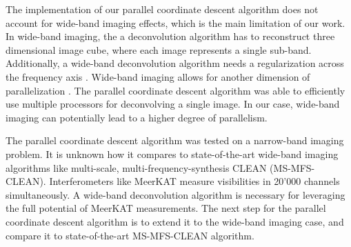 The implementation of our parallel coordinate descent algorithm does not account for wide-band imaging effects, which is the main limitation of our work. In wide-band imaging, the a deconvolution algorithm has to reconstruct three dimensional image cube, where each image represents a single sub-band. Additionally, a wide-band deconvolution algorithm needs a regularization across the frequency axis \cite{ferrari2015multi}. Wide-band imaging allows for another dimension of parallelization \cite{ferrari2015multi}. The parallel coordinate descent algorithm was able to efficiently use multiple processors for deconvolving a single image. In our case, wide-band imaging can potentially lead to a higher degree of parallelism.

The parallel coordinate descent algorithm was tested on a narrow-band imaging problem. It is unknown how it compares to state-of-the-art wide-band imaging algorithms like multi-scale, multi-frequency-synthesis CLEAN (MS-MFS-CLEAN). Interferometers like MeerKAT measure visibilities in 20'000 channels simultaneously. A wide-band deconvolution algorithm is necessary for leveraging the full potential of MeerKAT measurements. The next step for the parallel coordinate descent algorithm is to extend it to the wide-band imaging case, and compare it to state-of-the-art MS-MFS-CLEAN algorithm.
 







